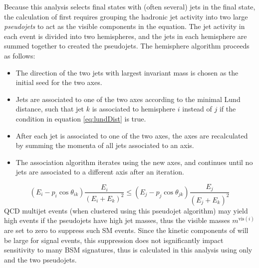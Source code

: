 Because this analysis selects final states with (often several) jets in the final state, the calculation of \mttwo first requires grouping the hadronic jet activity into two large {\it pseudojets} to act as the visible components in the \mttwo equation. The jet activity in each event is divided into two hemispheres, and the jets in each hemisphere are summed together to created the pseudojets. The hemisphere algorithm proceeds as follows:
\begin{itemize}
	\item The direction of the two jets with largest invariant mass is chosen as the initial seed for the two axes.
	\item Jets are associated to one of the two axes according to the minimal Lund distance, such that jet $k$ is associated to hemisphere $i$ instead of $j$ if the condition in equation \ref{eq:lundDist} is true.
	\item After each jet is associated to one of the two axes, the axes are recalculated by summing the momenta of all jets associated to an axis.
	\item The association algorithm iterates using the new axes, and continues until no jets are associated to a different axis after an iteration.
\end{itemize}
\begin{equation}
	(E_i - p_i \cos \theta_{ik}) \frac{E_i}{(E_i+E_k)^2} \leq (E_j - p_j \cos \theta_{jk}) \frac{E_j}{(E_j+E_k)^2} 
	\label{eq:lundDist}
\end{equation}
QCD multijet events (when clustered using this pseudojet algorithm) may yield high \mttwo events if the pseudojets have high jet masses, thus the visible masses $m^{\text{vis}(i)}$ are set to zero to suppress such SM events. Since the kinetic components of \mttwo will be large for signal events, this suppression does not isgnificantly impact sensitivity to many BSM signatures, thus \mttwo is calculated in this analysis using only \MET and the two pseudojets.


